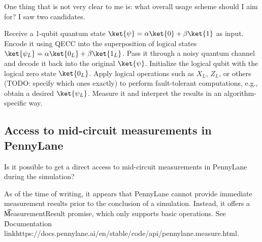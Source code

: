 \begin{QUESTION}
One thing that is not very clear to me is: what overall usage scheme should I aim for? I saw two
candidates.

\ls Receive a 1-qubit quantum state $\ket{\psi} = \alpha\ket{0} + \beta\ket{1}$ as input. Encode it
    using QECC into the superposition of logical states $\ket{\psi_L} = \alpha\ket{0_L} +
    \beta\ket{1_L}$. Pass it through a noisy quantum channel and decode it back into the original
    $\ket{\psi}$.
\li Initialize the logical qubit with the logical zero state $\ket{0_L}$. Apply logical operations
    such as $X_L$, $Z_L$, or others (TODO: specify which ones exactly) to perform fault-tolerant
    computations, e.g., obtain a desired $\ket{\psi_L}$. Measure it and interpret the results in an
    algorithm-specific way.
\le
\end{QUESTION}

\subsection{Access to mid-circuit measurements in PennyLane}

\begin{QUESTION}
Is it possible to get a direct access to mid-circuit measurements in PennyLane during the
simulation?
\end{QUESTION}

\vsp

As of the time of writing, it appears that PennyLane cannot provide immediate measurement results
prior to the conclusion of a simulation. Instead, it offers a \t{MeasurementResult} promise, which
only supports basic operations. See
\u{Documentation link}{https://docs.pennylane.ai/en/stable/code/api/pennylane.measure.html}.

% 

